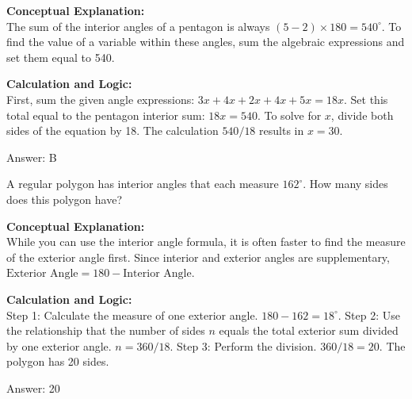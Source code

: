 \documentclass[11pt,paper=a4,answers]{exam}
\begin{document}
\begin{questions}
\begin{solution}
\textbf{Conceptual Explanation:} \\
The sum of the interior angles of a pentagon is always $(5-2) \times 180 = 540^\circ$. To find the value of a variable within these angles, sum the algebraic expressions and set them equal to 540.

\vspace{30pt}

\textbf{Calculation and Logic:} \\
First, sum the given angle expressions: $3x + 4x + 2x + 4x + 5x = 18x$. Set this total equal to the pentagon interior sum: $18x = 540$. To solve for $x$, divide both sides of the equation by 18. The calculation $540 / 18$ results in $x = 30$.

\vspace{30pt}

Answer: \colorbox{yellow!100}{B}
\end{solution}

\vspace{60pt}

\question
A regular polygon has interior angles that each measure $162^\circ$. How many sides does this polygon have?

\begin{solution}
\textbf{Conceptual Explanation:} \\
While you can use the interior angle formula, it is often faster to find the measure of the exterior angle first. Since interior and exterior angles are supplementary, $\text{Exterior Angle} = 180 - \text{Interior Angle}$.

\vspace{30pt}

\textbf{Calculation and Logic:} \\
Step 1: Calculate the measure of one exterior angle. $180 - 162 = 18^\circ$. Step 2: Use the relationship that the number of sides $n$ equals the total exterior sum divided by one exterior angle. $n = 360 / 18$. Step 3: Perform the division. $360 / 18 = 20$. The polygon has 20 sides.

\vspace{30pt}

Answer: \colorbox{yellow!100}{20}
\end{solution}

\vspace{60pt}


\end{questions}
\end{document}
